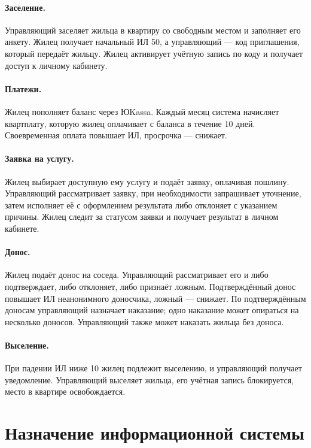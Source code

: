 \documentclass[12pt,a4paper]{article}
\begin{document}
\paragraph{Заселение.} Управляющий заселяет жильца в квартиру со свободным местом и
заполняет его анкету. Жилец получает начальный ИЛ 50, а управляющий --- код
приглашения, который передаёт жильцу. Жилец активирует учётную запись по
коду и получает доступ к личному кабинету.

\paragraph{Платежи.} Жилец пополняет баланс через ЮKassa. Каждый месяц
система начисляет квартплату, которую жилец оплачивает с баланса в течение
10 дней. Своевременная оплата повышает ИЛ, просрочка --- снижает.

\paragraph{Заявка на услугу.} Жилец выбирает доступную ему услугу и подаёт
заявку, оплачивая пошлину. Управляющий рассматривает заявку, при
необходимости запрашивает уточнение, затем исполняет её с оформлением
результата либо отклоняет с указанием причины. Жилец следит за статусом
заявки и получает результат в личном кабинете.

\paragraph{Донос.} Жилец подаёт донос на соседа. Управляющий рассматривает
его и либо подтверждает, либо отклоняет, либо признаёт ложным.
Подтверждённый донос повышает ИЛ неанонимного доносчика, ложный ---
снижает. По подтверждённым доносам управляющий назначает наказание; одно
наказание может опираться на несколько доносов. Управляющий также может
наказать жильца без доноса.

\paragraph{Выселение.} При падении ИЛ ниже 10 жилец подлежит выселению, и
управляющий получает уведомление. Управляющий выселяет жильца, его учётная запись
блокируется, место в квартире освобождается.

\section{Назначение информационной системы}
\end{document}
